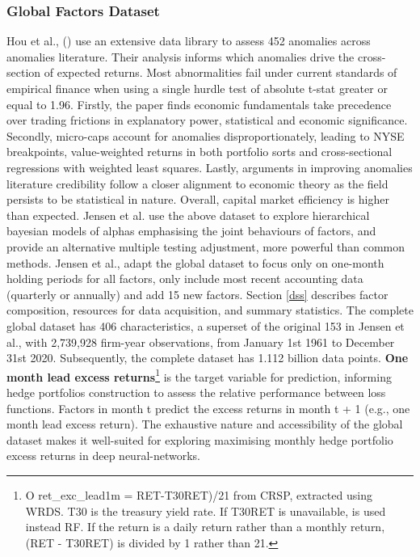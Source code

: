 \documentclass[12pt]{article}
\begin{document}
\subsubsection{Global Factors Dataset}
Hou et al., (\citeyear{hou2020replicating}) use an extensive data library to assess 452 anomalies across anomalies literature.
Their analysis informs which anomalies drive the cross-section of expected returns. 
Most abnormalities fail under current standards of empirical finance when using a single hurdle test of absolute t-stat greater or equal to 1.96.
Firstly, the paper finds economic fundamentals take precedence over trading frictions in explanatory power, statistical and economic significance.
Secondly, micro-caps account for anomalies disproportionately, leading to NYSE breakpoints, value-weighted returns in both portfolio sorts and cross-sectional regressions with weighted least squares. 
Lastly, arguments in improving anomalies literature credibility follow a closer alignment to economic theory as the field persists to be statistical in nature.
Overall, capital market efficiency is higher than expected.
Jensen et al. \citeyear{jensen2021there} use the above dataset to explore hierarchical bayesian models of alphas emphasising the joint behaviours of factors, 
and provide an alternative multiple testing adjustment, more powerful than common methods.
Jensen et al., adapt the global dataset to focus only on one-month holding periods for all factors, only include most recent accounting data (quarterly or annually) and add 15 new factors.
Section \ref{dss} describes factor composition, resources for data acquisition, and summary statistics.
The complete global dataset has 406 characteristics, a superset of the original 153 in Jensen et al., with 2,739,928 firm-year observations, from January 1st 1961 to December 31st 2020.
Subsequently, the complete dataset has 1.112 billion data points. \textbf{One month lead excess returns}\footnote{O ret\_exc\_lead1m = RET-T30RET)/21 from CRSP, extracted using WRDS. T30 is the treasury yield rate. 
If T30RET is unavailable, is used instead RF. If the return is a daily return rather than a monthly return, (RET - T30RET) is divided by 1 rather than 21.} 
is the target variable for prediction, informing hedge portfolios construction to
assess the relative performance between loss functions.
Factors in month t predict the excess returns in month t + 1 (e.g., one month lead excess return). 
The exhaustive nature and accessibility of the global dataset makes it well-suited for exploring maximising monthly hedge portfolio excess returns in deep neural-networks.
\end{document}
